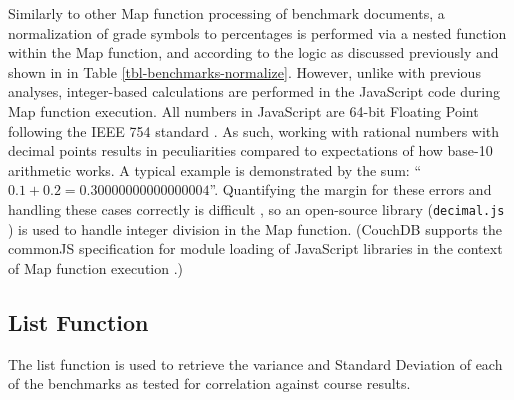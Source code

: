 Similarly to other Map function processing of benchmark documents, a normalization of grade symbols to percentages is performed via a nested function within the Map function, and according to the logic as discussed previously and shown in in Table \ref{tbl-benchmarks-normalize}. However, unlike with previous analyses, integer-based calculations are performed in the JavaScript code during Map function execution. All numbers in JavaScript are 64-bit Floating Point following the IEEE 754 standard \cite{floatingPoint}. As such, working with rational numbers with decimal points results in peculiarities compared to expectations of how base-10 arithmetic works. A typical example is demonstrated by the sum: ``$0.1 + 0.2 = 0.30000000000000004$''. Quantifying the margin for these errors and handling these cases correctly is difficult \cite{Goldberg1991}, so an open-source library (\texttt{decimal.js} \cite{decimaljs}) is used to handle integer division in the Map function. (CouchDB supports the commonJS specification for module loading of JavaScript libraries in the context of Map function execution \cite{commonJsMapFn}.)



\subsection{List Function}
The list function is used to retrieve the variance and Standard Deviation of each of the benchmarks as tested for correlation against course results.